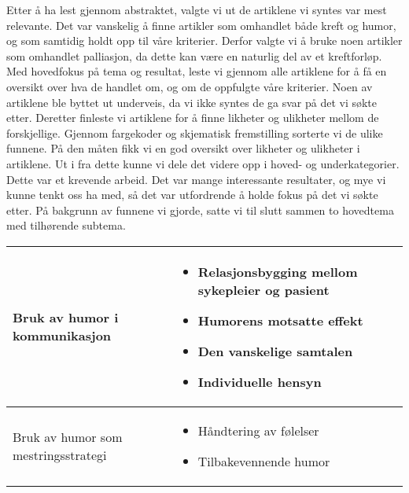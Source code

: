 Etter å ha lest gjennom abstraktet, valgte vi ut de artiklene vi syntes var
mest relevante. Det var vanskelig å finne artikler som omhandlet både kreft og
humor, og som samtidig holdt opp til våre kriterier. Derfor valgte vi å bruke
noen artikler som omhandlet palliasjon, da dette kan være en naturlig del av et
kreftforløp. Med hovedfokus på tema og resultat, leste vi gjennom alle
artiklene for å få en oversikt over hva de handlet om, og om de oppfulgte våre
kriterier. Noen av artiklene ble byttet ut underveis, da vi ikke syntes de ga
svar på det vi søkte etter. Deretter finleste vi artiklene for å finne likheter
og ulikheter mellom de forskjellige. Gjennom fargekoder og skjematisk
fremstilling sorterte vi de ulike funnene. På den måten fikk vi en god oversikt
over likheter og ulikheter i artiklene. Ut i fra dette kunne vi dele det videre
opp i hoved- og underkategorier. Dette var et krevende arbeid. Det var mange
interessante resultater, og mye vi kunne tenkt oss ha med, så det var
utfordrende å holde fokus på det vi søkte etter. På bakgrunn av funnene vi
gjorde, satte vi til slutt sammen to hovedtema med tilhørende  subtema.

\begin{table}[h]
  \centering
  \begin{tabularx}{\textwidth}{|l|X|}
    \hline
    Bruk av humor i kommunikasjon &
      \begin{itemize}
        \item Relasjonsbygging mellom sykepleier og pasient
        \item Humorens motsatte effekt
        \item Den vanskelige samtalen
        \item Individuelle hensyn
      \end{itemize}
      \\ \hline
    Bruk av humor som mestringsstrategi &
      \begin{itemize}
        \item Håndtering av følelser
        \item Tilbakevennende humor
      \end{itemize}
      \\ \hline
  \end{tabularx}
\end{table}
